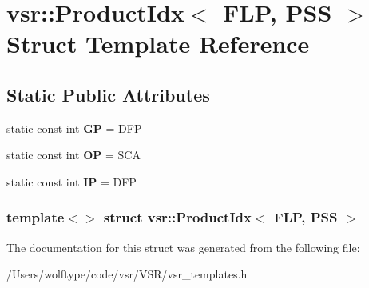 \hypertarget{structvsr_1_1_product_idx_3_01_f_l_p_00_01_p_s_s_01_4}{\section{vsr\-:\-:Product\-Idx$<$ F\-L\-P, P\-S\-S $>$ Struct Template Reference}
\label{structvsr_1_1_product_idx_3_01_f_l_p_00_01_p_s_s_01_4}
}
\subsection*{Static Public Attributes}
\begin{DoxyCompactItemize}
\item 
\hypertarget{structvsr_1_1_product_idx_3_01_f_l_p_00_01_p_s_s_01_4_a238e57753d3609c5b560e9abf6daa8fa}{static const int {\bfseries G\-P} = D\-F\-P}\label{structvsr_1_1_product_idx_3_01_f_l_p_00_01_p_s_s_01_4_a238e57753d3609c5b560e9abf6daa8fa}

\item 
\hypertarget{structvsr_1_1_product_idx_3_01_f_l_p_00_01_p_s_s_01_4_ab74c761ecf39e2764e630c8bcf5dca68}{static const int {\bfseries O\-P} = S\-C\-A}\label{structvsr_1_1_product_idx_3_01_f_l_p_00_01_p_s_s_01_4_ab74c761ecf39e2764e630c8bcf5dca68}

\item 
\hypertarget{structvsr_1_1_product_idx_3_01_f_l_p_00_01_p_s_s_01_4_a2cbf072e3f872922c2e3463d058114d0}{static const int {\bfseries I\-P} = D\-F\-P}\label{structvsr_1_1_product_idx_3_01_f_l_p_00_01_p_s_s_01_4_a2cbf072e3f872922c2e3463d058114d0}

\end{DoxyCompactItemize}
\subsubsection*{template$<$$>$ struct vsr\-::\-Product\-Idx$<$ F\-L\-P, P\-S\-S $>$}



The documentation for this struct was generated from the following file\-:\begin{DoxyCompactItemize}
\item 
/\-Users/wolftype/code/vsr/\-V\-S\-R/vsr\-\_\-templates.\-h\end{DoxyCompactItemize}
